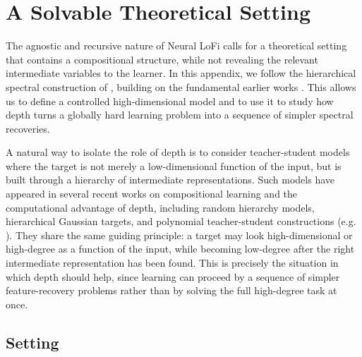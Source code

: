 \section{A Solvable Theoretical Setting}

\label{2605:app:th_rf}


The agnostic and recursive nature of Neural LoFi calls for a theoretical setting that contains a compositional structure, while not revealing the relevant intermediate variables to the learner. In this appendix, we follow the hierarchical spectral construction of \cite{tabanelli2026deep}, building on the fundamental  earlier works \cite{wang2024learning,nichani2023provable,fu2025learning}. 
This allows us to define a controlled high-dimensional model and to use it to study how depth turns a globally hard learning problem into a sequence of simpler spectral recoveries.

A natural way to isolate the role of depth is to consider teacher-student models where the target is not merely a low-dimensional function of the input, but is built through a hierarchy of intermediate representations. Such models have appeared in several recent works on compositional learning and the computational advantage of depth, including random hierarchy models, hierarchical Gaussian targets, and polynomial teacher-student constructions (e.g.
\cite{cagnetta2024how,garnierbrun2025how,dandi2026computational,wang2024learning,nichani2023provable,fu2025learning,cagnetta2025learning,tabanelli2026deep,cagnetta2026deriving,ren2026provable}). 
They share the same guiding principle: a target may look high-dimensional or high-degree as a function of the input, while becoming low-degree after the right intermediate representation has been found. This is precisely the situation in which depth should help, since learning can proceed by a sequence of simpler feature-recovery problems rather than by solving the full high-degree task at once.

\subsection{Setting}\label{2605:subsec:set_th}

